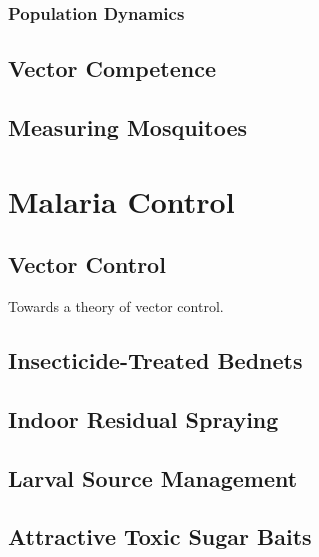 \documentclass[
]{book}
\begin{document}
\hypertarget{population-dynamics}{%
\section{Population Dynamics}\label{population-dynamics}}

\hypertarget{vector-competence}{%
\chapter{Vector Competence}\label{vector-competence}}

\hypertarget{measuring-mosquitoes}{%
\chapter{Measuring Mosquitoes}\label{measuring-mosquitoes}}

\hypertarget{part-malaria-control}{%
\part{Malaria Control}\label{part-malaria-control}}

\hypertarget{vector-control}{%
\chapter{Vector Control}\label{vector-control}}

Towards a theory of vector control.

\hypertarget{insecticide-treated-bednets}{%
\chapter{Insecticide-Treated Bednets}\label{insecticide-treated-bednets}}

\hypertarget{indoor-residual-spraying}{%
\chapter{Indoor Residual Spraying}\label{indoor-residual-spraying}}

\hypertarget{larval-source-management}{%
\chapter{Larval Source Management}\label{larval-source-management}}

\hypertarget{attractive-toxic-sugar-baits}{%
\chapter{Attractive Toxic Sugar Baits}\label{attractive-toxic-sugar-baits}}
\end{document}
